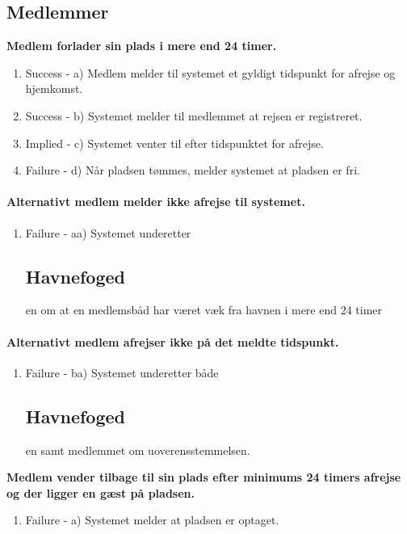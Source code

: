 \subsection{Medlemmer}
	\item{\bf{Medlem forlader sin plads i mere end 24 timer.}}
	  \begin{enumerate}
			\item Success -  a) Medlem melder til systemet et gyldigt tidspunkt for afrejse og hjemkomst.
			\item Success -  b) Systemet melder til medlemmet at rejsen er registreret. 
			\item Implied -  c) Systemet venter til efter tidspunktet for afrejse.
			\item Failure -  d) Når pladsen tømmes, melder systemet at pladsen er fri.
	   \end{enumerate}
			
	\paragraph{Alternativt medlem melder ikke afrejse til systemet.}
	  \begin{enumerate}
			\item Failure -  aa) Systemet underetter \subsection{Havnefoged}en om at en medlemsbåd har været væk fra havnen i mere end 24 timer
	   \end{enumerate}
	   
	\paragraph{Alternativt medlem afrejser ikke på det meldte tidspunkt.}
	  \begin{enumerate}
			\item Failure -  ba) Systemet underetter både \subsection{Havnefoged}en samt medlemmet om uoverensstemmelsen.
	   \end{enumerate}
	   
	\item{\bf{Medlem vender tilbage til sin plads efter minimums 24 timers afrejse og der ligger en gæst på pladsen.}}
	  \begin{enumerate}
			\item Failure -  a) Systemet melder at pladsen er optaget.
	   \end{enumerate}
	   
